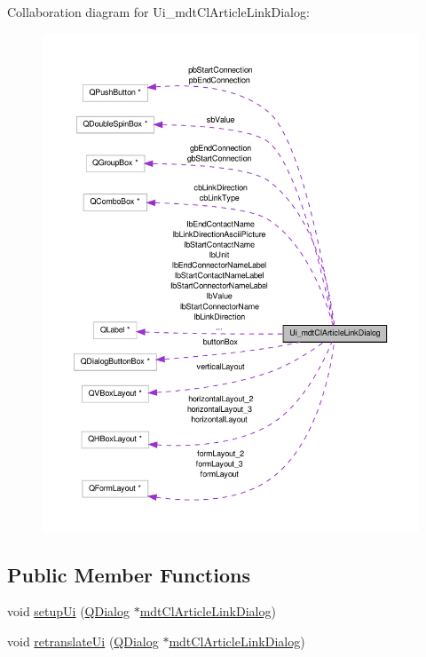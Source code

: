 Collaboration diagram for Ui\-\_\-mdt\-Cl\-Article\-Link\-Dialog\-:
\nopagebreak
\begin{figure}[H]
\begin{center}
\leavevmode
\includegraphics[width=350pt]{class_ui__mdt_cl_article_link_dialog__coll__graph}
\end{center}
\end{figure}
\subsection*{Public Member Functions}
\begin{DoxyCompactItemize}
\item 
void \hyperlink{class_ui__mdt_cl_article_link_dialog_ade2eec293670997759449026eab49152}{setup\-Ui} (\hyperlink{class_q_dialog}{Q\-Dialog} $\ast$\hyperlink{classmdt_cl_article_link_dialog}{mdt\-Cl\-Article\-Link\-Dialog})
\item 
void \hyperlink{class_ui__mdt_cl_article_link_dialog_a5c4764ae500c259fa03c703f9c8ea884}{retranslate\-Ui} (\hyperlink{class_q_dialog}{Q\-Dialog} $\ast$\hyperlink{classmdt_cl_article_link_dialog}{mdt\-Cl\-Article\-Link\-Dialog})
\end{DoxyCompactItemize}
